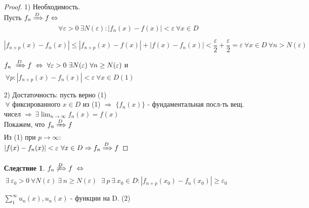 \documentclass[a4paper, 12pt]{article}
\newtheorem{Consequence}{Следствие}
\begin{document}
    \begin{proof}
        1) Необходимость.\\
        Пусть $f_n \xRightarrow{D} f \Leftrightarrow$
        \[\ \forall \varepsilon > 0 \ \exists N(\varepsilon):
        \left| f_n(x) - f(x)\right| < \varepsilon \ \forall x \in D\]

        \[\left| f_{n + p}(x) - f_n(x)\right| \le
        \left| f_{n + p}(x) - f(x)\right| + \left| f(x) - f_n(x)\right|
        < \dfrac{\varepsilon}{2} + \dfrac{\varepsilon}{2} = \varepsilon
        \ \forall x \in D \ \forall n > N(\varepsilon)\]

        $f_n \ \xRightarrow{D} f \ \Leftrightarrow \ \forall \varepsilon > 0
        \ \exists N(\varepsilon) \ \forall n \ge N(\varepsilon)$ и $\ \forall
        p: \left| f_{n + p}(x) - f_n(x) \right| < \varepsilon \ \forall x
        \in D (1)$

        2) Достаточность: пусть верно (1) \\
        $\ \forall$ фиксированного $x \in D$ из (1) $\Rightarrow$ $\{f_n(x)\}$
        - фундаментальная посл-ть вещ. чисел $\Rightarrow \ \exists
        \displaystyle \lim^{}_{n \rightarrow \infty} f_n(x) = f(x)$ \\
        Покажем, что $f_n \xRightarrow{D} f$ \\
        Из (1) при $p \rightarrow \infty:$ \\
        $\left| f(x) - f_n(x) \right| < \varepsilon \ \forall x \in D
        \Rightarrow f_n \xRightarrow{D} f$
    \end{proof}
    \newpage
    \begin{Consequence}
        $f_n \not \xRightarrow{D} f \ \Leftrightarrow$\\
        $\ \exists \ \varepsilon_0
        > 0 \ \forall N(\varepsilon) \ \exists \  n \ge N(\varepsilon)$
        $\ \exists \  p \ \exists \  x_0 \in D:
        \left| f_{n + p}(x_0) - f_n(x_0)\right| \ge \varepsilon_0$
    \end{Consequence}

    \vspace{1cm}
    $\displaystyle \sum ^{\infty}_{1} u_n(x), u_n(x)$ - функции на D. (2)
\end{document}
